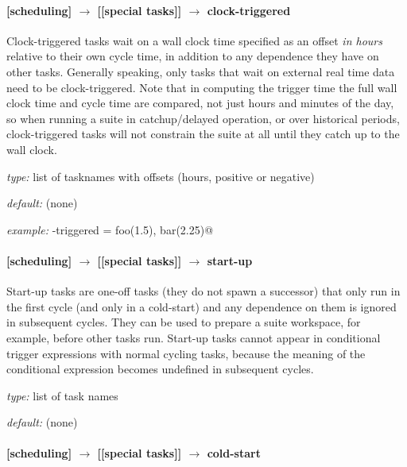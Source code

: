 \paragraph[clock-triggered]{[scheduling] $\rightarrow$ [[special tasks]] $\rightarrow$ clock-triggered}

Clock-triggered tasks wait on a wall clock time specified as an offset
{\em in hours} relative to their own cycle time, in addition to any
dependence they have on other tasks. Generally speaking, only tasks that
wait on external real time data need to be clock-triggered.  Note that
in computing the trigger time the full wall clock time and cycle time
are compared, not just hours and minutes of the day, so when running a
suite in catchup/delayed operation, or over historical periods,
clock-triggered tasks will not constrain the suite at all until they
catch up to the wall clock.

\begin{myitemize}
    \item {\em type:} list of tasknames with offsets (hours, positive or negative)
    \item {\em default:} (none)
    \item {\em example:} \lstinline@clock-triggered = foo(1.5), bar(2.25)@
\end{myitemize}

\paragraph[start-up]{[scheduling] $\rightarrow$ [[special tasks]] $\rightarrow$ start-up}

Start-up tasks are one-off tasks (they do not spawn a successor) that
only run in the first cycle (and only in a cold-start) and any
dependence on them is ignored in subsequent cycles. They can be used to
prepare a suite workspace, for example, before other tasks run. Start-up
tasks cannot appear in conditional trigger expressions with normal
cycling tasks, because the meaning of the conditional expression becomes
undefined in subsequent cycles. 

\begin{myitemize}
    \item {\em type:} list of task names
    \item {\em default:} (none)
\end{myitemize}

\paragraph[cold-start]{[scheduling] $\rightarrow$ [[special tasks]] $\rightarrow$ cold-start}

